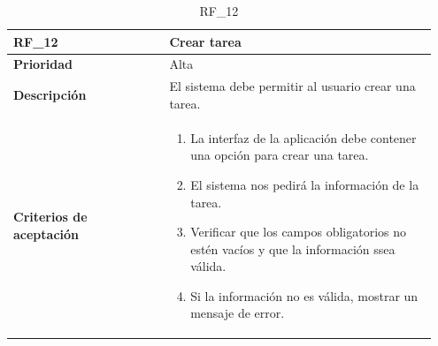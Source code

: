 \begin{table}[htb!]
    \begin{tabular}{|p{0.35\linewidth}|p{0.6\linewidth}|}
        \hline
        \rowcolor[HTML]{C0C0C0}  
        \textbf{RF\_12} & \textbf{Crear tarea} \\
        \hline
        \textbf{Prioridad} & Alta \\
        \hline
        \textbf{Descripción} & El sistema debe permitir al usuario crear una tarea.  \\
        \hline
        \vspace{0.5mm}
        \textbf{Criterios de aceptación} & 
        \begin{minipage}[t]{0.9\linewidth}
            \begin{enumerate}
                \item La interfaz de la aplicación debe contener una opción para crear una tarea.
                \item El sistema nos pedirá la información de la tarea.
                \item Verificar que los campos  obligatorios no estén vacíos y que la información ssea válida.
                \item Si la información no es válida, mostrar un mensaje de error.
            \end{enumerate}
            \vspace{2mm}
        \end{minipage} \\
        \hline
    \end{tabular}
    \caption{RF\_12}
    \label{req:RF12}
\end{table}


